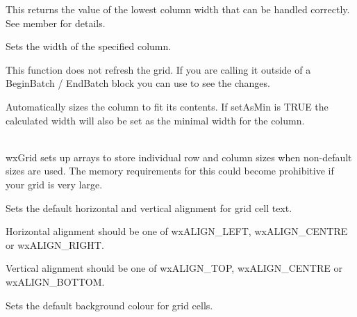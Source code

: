 \label{wxgridgetcolminimalacceptablewidth}


This returns the value of the lowest column width that can be handled correctly. See
member  for details.

\label{wxgridsetcolsize}


Sets the width of the specified column. 

This function does not refresh the grid. If you are calling it outside of a BeginBatch / EndBatch
block you can use  to see the changes. 

Automatically sizes the column to fit its contents. If setAsMin is TRUE the calculated width will
also be set as the minimal width for the column.

\\
wxGrid sets up arrays to store individual row and column sizes when non-default sizes are used.
The memory requirements for this could become prohibitive if your grid is very large. 

\label{wxgridsetdefaultcellalignment}


Sets the default horizontal and vertical alignment for grid cell text.

Horizontal alignment should be one of wxALIGN\_LEFT, wxALIGN\_CENTRE or wxALIGN\_RIGHT.

Vertical alignment should be one of wxALIGN\_TOP, wxALIGN\_CENTRE or wxALIGN\_BOTTOM.

\label{wxgridsetdefaultcellbackgroundcolour}


Sets the default background colour for grid cells.

\label{wxgridsetdefaultcellfont}


